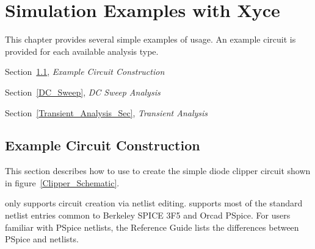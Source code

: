 


\chapter{Simulation Examples with Xyce}
\label{Sim_Examples}

{
This chapter provides several simple examples of \Xyce{} usage.
An example circuit is provided for each available analysis type.
\begin{XyceItemize}
\item Section~\ref{Example_Construction}, \emph{Example Circuit Construction}
\item Section~\ref{DC_Sweep}, \emph{DC Sweep Analysis}
\item Section~\ref{Transient_Analysis_Sec}, \emph{Transient Analysis}
\end{XyceItemize}
}

\section{Example Circuit Construction}
\label{Example_Construction}

This section describes how to use \Xyce{} to create the simple 
diode clipper circuit shown in figure~\ref{Clipper_Schematic}.

\Xyce{} only supports circuit creation via  netlist
editing.  \Xyce{} supports most of the standard netlist entries common
to Berkeley SPICE 3F5 and Orcad PSpice.
For users familiar with PSpice netlists, the \Xyce{} Reference
Guide\ReferenceGuide{} lists the differences between PSpice and \Xyce{}
netlists.  

